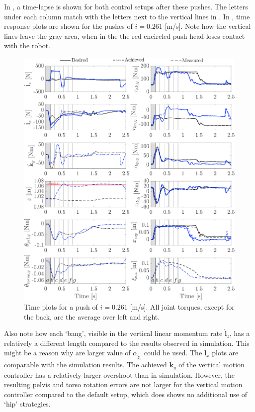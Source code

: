In , a time-lapse is shown for both control setups after these pushes. The letters under each column match with the letters next to the vertical lines in . In , time response plots are shown for the pushes of $i=0.261$ [m/s]. Note how the vertical lines leave the gray area, when in the  the red encircled push head loses contact with the robot. 
\begin{figure}
\centering
\includegraphics[width=1.0\textwidth]{STYLESTUFF/valcomparetimeHW.png}
\caption{Time plots for a push of $i=0.261$ [m/s]. All joint torques, except for the back, are the average over left and right.}
\label{fig:valcomparetimeHW}
\end{figure}

Also note how each `bang', visible in the vertical linear momentum rate $\dot{\mathbf{l}}_z$, has a relatively a different length compared to the results observed in simulation. This might be a reason why are larger value of $\alpha_{\hat{\ddot{z}}_{c}}$ could be used. The $\dot{\mathbf{l}}_x$ plots are comparable with the simulation results. The achieved $\dot{\mathbf{k}}_y$ of the vertical motion controller has a relatively larger overshoot than in simulation. However, the resulting pelvis and torso rotation errors are not larger for the vertical motion controller compared to the default setup, which does shows no additional use of `hip' strategies. 

